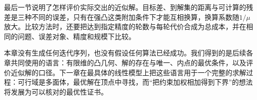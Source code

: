 最后一节说明了怎样评价实际交出的近似解。目标差、到解集的距离与可计算的残差是三种不同的误差，只有在强凸这类附加条件下才能互相换算，换算系数随$1/\mu$放大。比较方法时，还要把达到指定精度的轮数与每轮代价合成为总成本，并在相同的问题、误差对象、精度和规模下比较。

本章没有生成任何迭代序列，也没有假设任何算法已经成功。我们得到的是后续各章共同使用的语言：有限维的凸几何、解的存在与唯一、内点的最优条件，以及评价近似解的口径。下一章在最具体的线性模型上把这些语言用于一个完整的求解过程：可行域是多面体，最优解在顶点中寻找，而“把约束加权相加得到下界”的想法将发展为可以核对的最优性证书。
